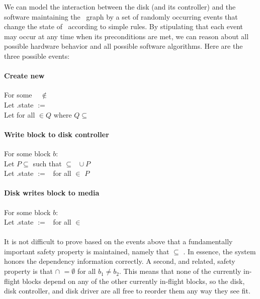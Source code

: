 We can model the interaction between the disk (and its controller) and the
software maintaining the \chdesc\ graph by a set of randomly occurring events
that change the state of \chdescs\ according to simple rules. By stipulating
that each event may occur at any time when its preconditions are met, we can
reason about all possible hardware behavior and all possible software
algorithms. Here are the three possible events:

\paragraph{Create new \chdesc}
For some \chdesc\  $\not\in$ \ChAll\: \\
Let .state $:=$ \statenone \\
Let  for all  $\in Q$ where $Q \subseteq$ \ChAll %

\paragraph{Write block to disk controller}
For some block $b$: \\
Let $P \subseteq$  such that  $\subseteq$ \ChDisk\ $\cup\ P$ \\
Let .state $:=$ \stateinf\ for all  $\in$ $P$

\paragraph{Disk writes block to media}
For some block $b$: \\
Let .state $:=$ \statedisk\ for all  $\in$ 

\paragraph{} It is not difficult to prove based on the events above that a
fundamentally important safety property is maintained, namely that
\BeforeS{\ChDisk} $\subseteq$ \ChDisk. In essence, the system honors the
dependency information correctly. A second, and related, safety property is that
 $\cap$  $= \emptyset$ for all $b_1 \neq b_2$.
This means that none of the currently in-flight blocks depend on any of the
other currently in-flight blocks, so the disk, disk controller, and disk driver
are all free to reorder them any way they see fit.

